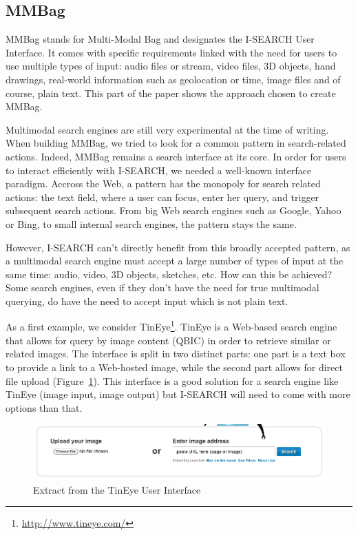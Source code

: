 \documentclass[runningheads,a4paper]{llncs} \usepackage[utf8]{inputenc}
\begin{document}
\subsection{MMBag}
MMBag stands for Multi-Modal Bag and designates the \mbox{I-SEARCH} User
Interface. It comes with specific requirements linked with the need for users to use multiple types of input: audio files or stream, video files, 3D objects, hand drawings, real-world information such as geolocation or time, image files and of course, plain text. This part of the paper shows the approach chosen to create MMBag.

Multimodal search engines are still very experimental at the time of writing. When building MMBag, we tried to look for a common pattern in search-related actions. Indeed, MMBag remains a search interface at its core. In order for users to interact efficiently with \mbox{I-SEARCH}, we needed a well-known interface paradigm. Accross the Web, a pattern has the monopoly for search related actions:  the text field, where a user can focus, enter her query, and trigger subsequent search actions. From big Web search engines such as Google, Yahoo or Bing, to small internal search engines, the pattern stays the same. 

However, \mbox{I-SEARCH} can't directly benefit from this broadly accepted pattern, as a multimodal search engine must accept a large number of types of input at the same time: audio, video, 3D objects, sketches, etc. How can this be achieved? Some search engines, even if they don't have the need for true multimodal querying, do have the need to accept input which is not plain text.

As a first example, we consider TinEye\footnote{\url{http://www.tineye.com/}}. TinEye is a Web-based search engine that allows for query by image content (QBIC) in order to retrieve similar or related images. The interface is split in two distinct parts: one part is a text box to provide a link to a Web-hosted image, while the second part allows for direct file upload (Figure~\ref{fig:tineye-ui}). This interface is a good solution for a search engine like TinEye (image input, image output) but \mbox{I-SEARCH} will need to come with more options than that.
\begin{figure}[h!]
  \centering
    \includegraphics[width=0.8\linewidth]{resources/tineye-UI.png}
  \caption{Extract from the TinEye User Interface}
  \label{fig:tineye-ui}
\end{figure}
\end{document}
